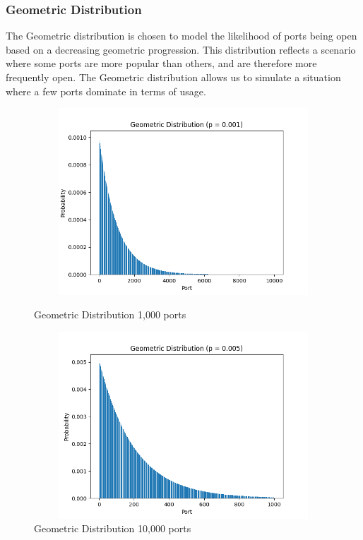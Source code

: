 \subsubsection{Geometric Distribution}

The Geometric distribution is chosen to model the likelihood of ports being open based on a decreasing geometric progression. This distribution reflects a scenario where some ports are more popular than others, and are therefore more frequently open. The Geometric distribution allows us to simulate a situation where a few ports dominate in terms of usage.

\begin{figure}[H]
\begin{adjustwidth}{-3cm}{-1cm}
\centering
\begin{minipage}{.45\textwidth}
  \centering
\includegraphics[width=12cm, height=7cm, keepaspectratio]{entropy/img/geometric_distribution_1000.png}
    \caption{Geometric Distribution 1,000 ports}
    \label{fig:geometric_distribution_1000}
\end{minipage}
\hspace{0.5cm}
\begin{minipage}{.45\textwidth}
\includegraphics[width=12cm, height=7cm, keepaspectratio]{entropy/img/geometric_distribution_10000.png}
    \caption{Geometric Distribution 10,000 ports}
    \label{fig:geometric_distribution_10000}
\end{minipage}
\end{adjustwidth}
\end{figure}

